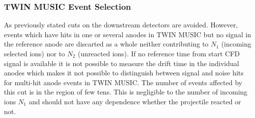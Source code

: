 \subsubsection{TWIN MUSIC Event Selection}
As previously stated cuts on the downstream detectors are avoided. However, events which have hits in one or several anodes in TWIN MUSIC but no signal in the reference anode are discarted as a whole neither contributing to $N_1$ (incoming selected ions) nor to $N_2$ (unreacted ions). If no reference time from start CFD signal is available it is not possible to measure the drift time in the individual anodes which makes it not possible to distinguish between signal and noise hits for multi-hit anode events in TWIN MUSIC. The number of events affected by this cut is in the region of few tens. This is negligible to the number of incoming ions $N_1$ and should not have any dependence whether the projectile reacted or not.
